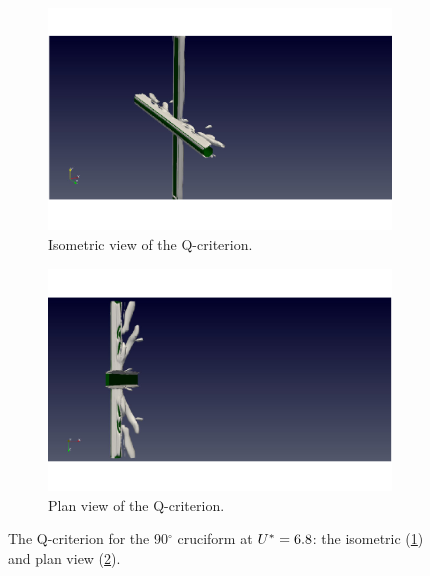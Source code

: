 \documentclass[oneside]{utmthesis}
\begin{document}
\begin{figure}[H]
  \centering
  \begin{subfigure}[h]{0.48\textwidth}
    \includegraphics[width=\textwidth,trim={1.5cm 0 3cm 0},clip]{figs/qIso090U02}
    \caption{Isometric view of the Q-criterion.}
    \label{fig:qIso090U02}
  \end{subfigure}
  \hfill
  \begin{subfigure}[h]{0.48\textwidth}
    \includegraphics[width=\textwidth,trim={1.5cm 0 3cm 0},clip]{figs/qTop090U02}
    \caption{Plan view of the Q-criterion.}
    \label{fig:qTop090U02}
  \end{subfigure}

  \caption{The Q-criterion for the 90$^{\circ}$ cruciform at $U^{*} = 6.8$: the isometric (\ref{fig:qIso090U02}) and plan view (\ref{fig:qTop090U02}).} \label{fig:qCrit090U02}
\end{figure}
\end{document}
